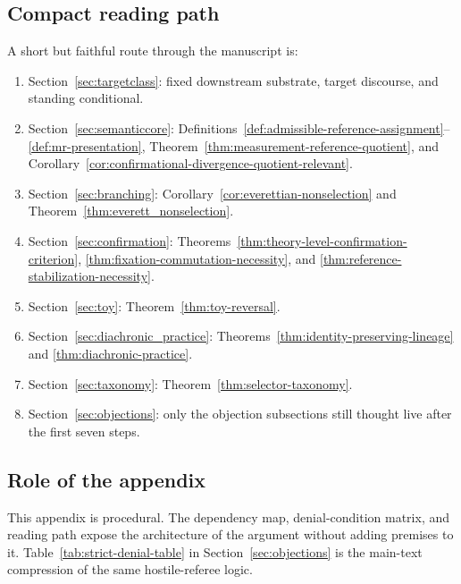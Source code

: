 \subsection{Compact reading path}

A short but faithful route through the manuscript is:
\begin{enumerate}
    \item Section~\ref{sec:targetclass}: fixed downstream substrate, target discourse, and standing
    conditional.
    \item Section~\ref{sec:semanticcore}: Definitions~\ref{def:admissible-reference-assignment}--\ref{def:mr-presentation},
    Theorem~\ref{thm:measurement-reference-quotient}, and
    Corollary~\ref{cor:confirmational-divergence-quotient-relevant}.
    \item Section~\ref{sec:branching}: Corollary~\ref{cor:everettian-nonselection} and
    Theorem~\ref{thm:everett_nonselection}.
    \item Section~\ref{sec:confirmation}: Theorems~\ref{thm:theory-level-confirmation-criterion},
    \ref{thm:fixation-commutation-necessity}, and
    \ref{thm:reference-stabilization-necessity}.
    \item Section~\ref{sec:toy}: Theorem~\ref{thm:toy-reversal}.
    \item Section~\ref{sec:diachronic_practice}: Theorems~\ref{thm:identity-preserving-lineage} and
    \ref{thm:diachronic-practice}.
    \item Section~\ref{sec:taxonomy}: Theorem~\ref{thm:selector-taxonomy}.
    \item Section~\ref{sec:objections}: only the objection subsections still thought live after the first
    seven steps.
\end{enumerate}

\subsection{Role of the appendix}

This appendix is procedural. The dependency map, denial-condition matrix, and reading path expose
the architecture of the argument without adding premises to it. Table~\ref{tab:strict-denial-table} in
Section~\ref{sec:objections} is the main-text compression of the same hostile-referee logic.
